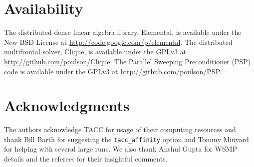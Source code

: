%

\section{Availability} The distributed dense linear algebra library, Elemental,
is available under the New BSD License at 
\url{http://code.google.com/p/elemental}. The distributed multifrontal solver, 
Clique, is available under the GPLv3 at 
\url{http://github.com/poulson/Clique}. The Parallel Sweeping 
Preconditioner (PSP) code is available under the GPLv3 at
\url{http://github.com/poulson/PSP}.

\section{Acknowledgments}
The authors acknowledge TACC for usage of their computing resources and 
thank Bill Barth for suggesting the \verb!tacc_affinity! option and Tommy 
Minyard for helping with several large runs. We also thank Anshul Gupta for 
WSMP details and the referees for their insightful comments.


 
